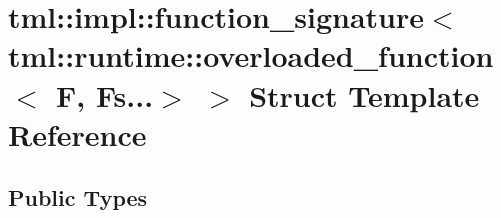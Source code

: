 \hypertarget{structtml_1_1impl_1_1function__signature_3_01tml_1_1runtime_1_1overloaded__function_3_01F_00_01Fs_8_8_8_4_01_4}{\section{tml\+:\+:impl\+:\+:function\+\_\+signature$<$ tml\+:\+:runtime\+:\+:overloaded\+\_\+function$<$ F, Fs...$>$ $>$ Struct Template Reference}
\label{structtml_1_1impl_1_1function__signature_3_01tml_1_1runtime_1_1overloaded__function_3_01F_00_01Fs_8_8_8_4_01_4}
}
\subsection*{Public Types}

